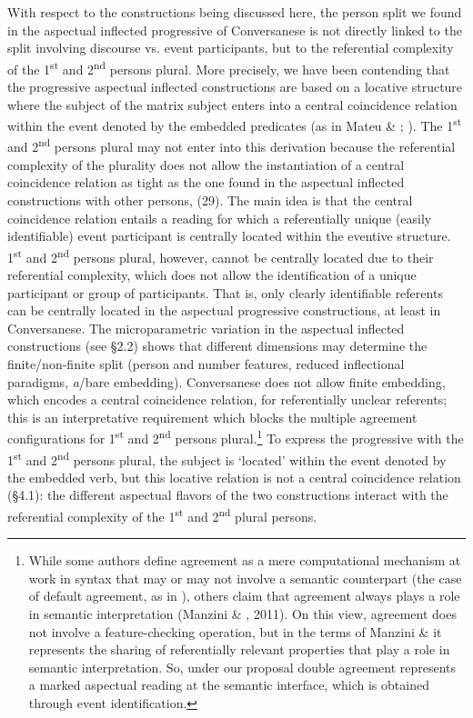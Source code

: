 \documentclass[output=paper]{langsci/langscibook}
\begin{document}
With respect to the constructions being discussed here, the person split we found in the aspectual inflected progressive of Conversanese is not directly linked to the split involving discourse vs. event participants, but to the referential complexity of the 1\textsuperscript{st} and 2\textsuperscript{nd} persons plural. More precisely, we have been contending that the progressive aspectual inflected constructions are based on a locative structure where the subject of the matrix subject enters into a central coincidence relation within the event denoted by the embedded predicates (as in Mateu \& \citealt{Amadas1999}; \citealt{Laka2006}). The 1\textsuperscript{st} and 2\textsuperscript{nd} persons plural may not enter into this derivation because the referential complexity of the plurality does not allow the instantiation of a central coincidence relation as tight as the one found in the aspectual inflected constructions with other persons, (29). The main idea is that the central coincidence relation entails a reading for which a referentially unique (easily identifiable) event participant is centrally located within the eventive structure. 1\textsuperscript{st} and 2\textsuperscript{nd} persons plural, however, cannot be centrally located due to their referential complexity, which does not allow the identification of a unique participant or group of participants. That is, only clearly identifiable referents can be centrally located in the aspectual progressive constructions, at least in Conversanese. The microparametric variation in the aspectual inflected constructions (see §2.2) shows that different dimensions may determine the finite/non-finite split (person and number features, reduced inflectional paradigms, \textit{a}/bare embedding). Conversanese does not allow finite embedding, which encodes a central coincidence relation, for referentially unclear referents; this is an interpretative requirement which blocks the multiple agreement configurations for 1\textsuperscript{st} and 2\textsuperscript{nd} persons plural.\footnote{While some authors define agreement as a mere computational mechanism at work in syntax that may or may not involve a semantic counterpart (the case of default agreement, as in \citealt{Preminger2014}), others claim that agreement always plays a role in semantic interpretation (Manzini \& \citealt{Savoia2007}, 2011). On this view, agreement does not involve a feature{}-checking operation, but in the terms of Manzini \& \citet{Savoia2007} it represents the sharing of referentially relevant properties that play a role in semantic interpretation. So, under our proposal double agreement represents a marked aspectual reading at the semantic interface, which is obtained through event identification.} To express the progressive with the 1\textsuperscript{st} and 2\textsuperscript{nd} persons plural, the subject is ‘located’ within the event denoted by the embedded verb, but this locative relation is not a central coincidence relation (§4.1): the different aspectual flavors of the two constructions interact with the referential complexity of the 1\textsuperscript{st} and 2\textsuperscript{nd} plural persons.
\end{document}
